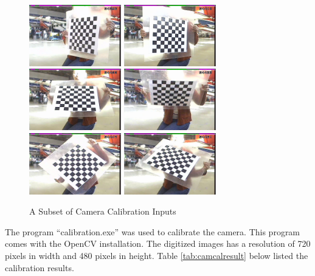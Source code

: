 \begin{figure}[h]
  \centering
  \includegraphics[width=4cm,keepaspectratio=true]{./Figures/camcal/camcal1_130.jpeg}
  \includegraphics[width=4cm,keepaspectratio=true]{./Figures/camcal/camcal1_140.jpeg}
  \includegraphics[width=4cm,keepaspectratio=true]{./Figures/camcal/camcal1_160.jpeg}
  \includegraphics[width=4cm,keepaspectratio=true]{./Figures/camcal/camcal1_180.jpeg}
  \includegraphics[width=4cm,keepaspectratio=true]{./Figures/camcal/camcal1_210.jpeg}
  \includegraphics[width=4cm,keepaspectratio=true]{./Figures/camcal/camcal1_240.jpeg}
  \caption{A Subset of Camera Calibration Inputs}
  \label{fig:camcal}
\end{figure}

The program ``calibration.exe'' was used to calibrate the camera. This
program comes with the OpenCV installation. The digitized images has a
resolution of 720 pixels in width and 480 pixels in height. Table
\ref{tab:camcalresult} below listed the calibration results.

